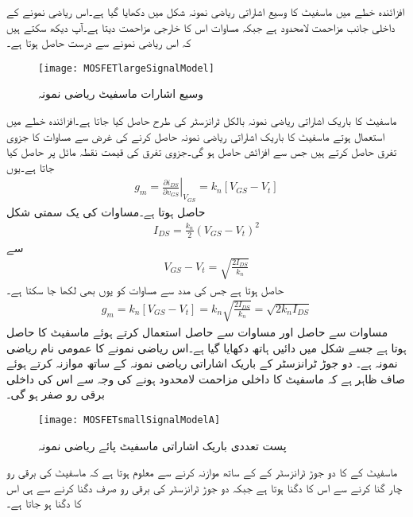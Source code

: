 افزائندہ خطے میں ماسفیٹ کا وسیع اشاراتی ریاضی نمونہ شکل   میں دکھایا گیا ہے۔اس ریاضی نمونے کے داخلی جانب مزاحمت لامحدود ہے جبکہ مساوات   اس کا خارجی مزاحمت   دیتا ہے۔آپ دیکھ سکتے ہیں کہ اس ریاضی نمونے  سے درست   حاصل ہوتا ہے۔
\begin{figure}
\centering
\texttt{[image: MOSFETlargeSignalModel]}
\caption{وسیع اشارات ماسفیٹ ریاضی نمونہ}
\label{شکل_وسیع_اشارات_ماسفیٹ_ماڈل}
\end{figure}

ماسفیٹ کا باریک اشاراتی ریاضی نمونہ بالکل  ٹرانزسٹر کی طرح حاصل کیا جاتا ہے۔افزائندہ خطے میں استعمال ہوتے ماسفیٹ کا باریک اشاراتی ریاضی نمونہ حاصل کرنے کی غرض سے مساوات   کا جزوی تفرق حاصل کرتے ہیں جس سے افزائش  حاصل ہو گی۔جزوی تفرق کی قیمت نقطہ مائل  پر حاصل کیا جاتا ہے۔یوں
\begin{align} \label{مساوات_میدانی_موصلیت_نما}
g_m = \left. \frac{\partial i_{DS}}{\partial v_{GS}} \right |_{V_{GS}}=k_n \left[V_{GS}-V_t \right ]
\end{align}
حاصل ہوتا ہے۔مساوات   کی یک سمتی شکل
\begin{align*}
I_{DS}=\frac{k_n}{2}\left(V_{GS}-V_t \right)^2
\end{align*}
سے
\begin{align*}
V_{GS}-V_t=\sqrt{\frac{2 I_{DS}}{k_n}}
\end{align*}
حاصل ہوتا ہے جس کی مدد سے مساوات  کو  یوں بھی لکھا جا سکتا ہے۔
\begin{align} \label{مساوات_میدانی_موصلیت_نما_الف}
g_m=k_n \left[V_{GS}-V_t \right ]=k_n \sqrt{\frac{2 I_{DS}}{k_n}}=\sqrt{2 k_n I_{DS}}
\end{align}
مساوات   سے حاصل   اور مساوات   سے حاصل   استعمال کرتے ہوئے ماسفیٹ کا  حاصل ہوتا ہے جسے شکل   میں دائیں ہاتھ دکھایا گیا ہے۔اس ریاضی نمونے کا عمومی نام   ریاضی نمونہ ہے۔ دو جوڑ ٹرانزسٹر کے باریک اشاراتی ریاضی نمونہ کے ساتھ موازنہ کرتے ہوئے صاف ظاہر ہے کہ ماسفیٹ کا داخلی مزاحمت لامحدود ہونے کی وجہ سے اس کی داخلی برقی رو صفر ہو گی۔
\begin{figure}
\centering
\texttt{[image: MOSFETsmallSignalModelA]}
\caption{پست تعددی باریک اشاراتی ماسفیٹ پائے ریاضی نمونہ}
\label{شکل_باریک_اشاراتی_ماسفیٹ_ماڈل}
\end{figure}
ماسفیٹ کے  کا دو جوڑ ٹرانزسٹر کے    کے ساتھ موازنہ کرنے سے معلوم ہوتا ہے کہ ماسفیٹ کی برقی رو چار گنا کرنے سے اس کا    دگنا ہوتا ہے جبکہ دو جوڑ ٹرانزسٹر کی برقی رو صرف دگنا کرنے سے ہی اس کا  دگنا ہو جاتا ہے۔


